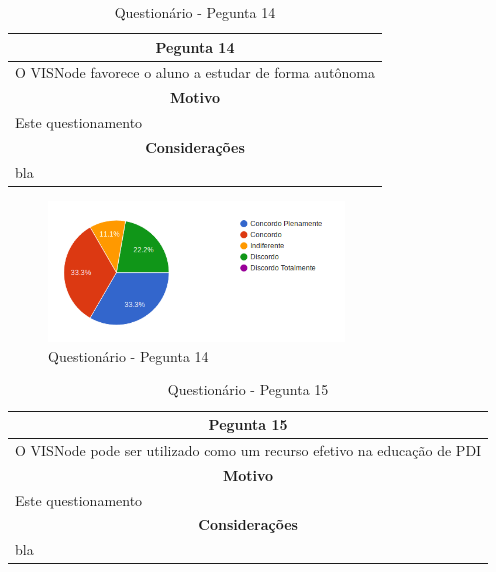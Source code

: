 \documentclass[
	12pt,				%
	oneside,			%
	a4paper,			%
	english,			%
	french,				%
	spanish,			%
	brazil,				%
	]{abntex2}
\begin{document}
\begin{table}[H]
\centering
\caption{Questionário - Pegunta 14} 
\def\arraystretch{1.5}
\begin{tabular}{l}
\hline
\multicolumn{1}{c}{\textbf{Pegunta 14}}              \\ \hline
O VISNode favorece o aluno a estudar de forma autônoma \\ \hline
\multicolumn{1}{c}{\textbf{Motivo}}                 \\ \hline
Este questionamento                                   \\ \hline
\multicolumn{1}{c}{\textbf{Considerações}}          \\ \hline
bla                                                   \\ \hline
\end{tabular}
\sourceAuthor
\end{table}

\begin{figure}[H]
\centering
\caption{Questionário - Pegunta 14}
\includegraphics[width=0.7\textwidth]{imagens/v1/p14.png}
\sourceAuthor
\end{figure}

\begin{table}[H]
\centering
\caption{Questionário - Pegunta 15} 
\def\arraystretch{1.5}
\begin{tabular}{l}
\hline
\multicolumn{1}{c}{\textbf{Pegunta 15}}              \\ \hline
O VISNode pode ser utilizado como um recurso efetivo na educação de PDI \\ \hline
\multicolumn{1}{c}{\textbf{Motivo}}                 \\ \hline
Este questionamento                                   \\ \hline
\multicolumn{1}{c}{\textbf{Considerações}}          \\ \hline
bla                                                   \\ \hline
\end{tabular}
\sourceAuthor
\end{table}
\end{document}
